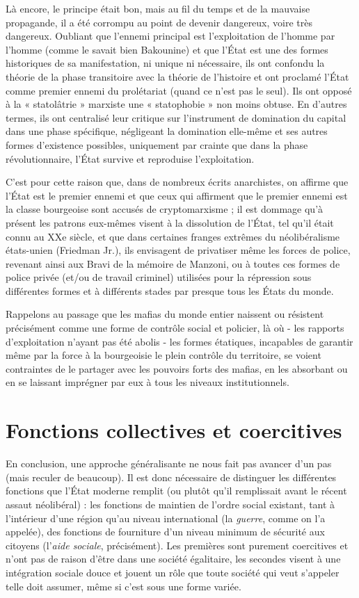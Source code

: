 Là encore, le principe était bon, mais au fil du temps et de la mauvaise propagande, il a été corrompu au point de devenir dangereux, voire très dangereux. Oubliant que l'ennemi principal est l'exploitation de l'homme par l'homme (comme le savait bien Bakounine) et que l'État est une des formes historiques de sa manifestation, ni unique ni nécessaire, ils ont confondu la théorie de la phase transitoire avec la théorie de l'histoire et ont proclamé l'État comme premier ennemi du prolétariat (quand ce n'est pas le seul). Ils ont opposé à la « statolâtrie » marxiste une « statophobie » non moins obtuse. En d'autres termes, ils ont centralisé leur critique sur l'instrument de domination du capital dans une phase spécifique, négligeant la domination elle-même et ses autres formes d'existence possibles, uniquement par crainte que dans la phase révolutionnaire, l'État survive et reproduise l'exploitation.

C'est pour cette raison que, dans de nombreux écrits anarchistes, on affirme que l'État est le premier ennemi et que ceux qui affirment que le premier ennemi est la classe bourgeoise sont accusés de cryptomarxisme ; il est dommage qu'à présent les patrons eux-mêmes visent à la dissolution de l'État, tel qu'il était connu au XXe siècle, et que dans certaines franges extrêmes du néolibéralisme états-unien (Friedman Jr.), ils envisagent de privatiser même les forces de police, revenant ainsi aux Bravi de la mémoire de Manzoni, ou à toutes ces formes de police privée (et/ou de travail criminel) utilisées pour la répression sous différentes formes et à différents stades par presque tous les États du monde.

Rappelons au passage que les mafias du monde entier naissent ou résistent précisément comme une forme de contrôle social et policier, là où - les rapports d'exploitation n'ayant pas été abolis - les formes étatiques, incapables de garantir même par la force à la bourgeoisie le plein contrôle du territoire, se voient contraintes de le partager avec les pouvoirs forts des mafias, en les absorbant ou en se laissant imprégner par eux à tous les niveaux institutionnels.

\section{Fonctions collectives et coercitives}

En conclusion, une approche généralisante ne nous fait pas avancer d'un pas (mais reculer de beaucoup). Il est donc nécessaire de distinguer les différentes fonctions que l'État moderne remplit (ou plutôt qu'il remplissait avant le récent assaut néolibéral) : les fonctions de maintien de l'ordre social existant, tant à l'intérieur d'une région qu'au niveau international (la \emph{guerre}, comme on l'a appelée), des fonctions de fourniture d'un niveau minimum de sécurité aux citoyens (l'\emph{aide sociale}, précisément). Les premières sont purement coercitives et n'ont pas de raison d'être dans une société égalitaire, les secondes visent à une intégration sociale douce et jouent un rôle que toute société qui veut s'appeler telle doit assumer, même si c'est sous une forme variée.


